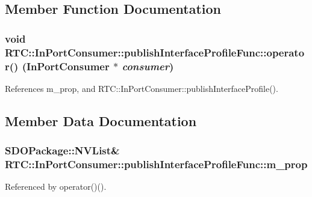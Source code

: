 \subsection{Member Function Documentation}
\subsubsection[{operator()}]{\setlength{\rightskip}{0pt plus 5cm}void RTC::InPortConsumer::publishInterfaceProfileFunc::operator() ({\bf InPortConsumer} $\ast$ {\em consumer})\hspace{0.3cm}{\ttfamily  [inline]}}\label{structRTC_1_1InPortConsumer_1_1publishInterfaceProfileFunc_a53d2bbae5f325aa19fdeb698fe347907}


References m\_\-prop, and RTC::InPortConsumer::publishInterfaceProfile().



\subsection{Member Data Documentation}
\subsubsection[{m\_\-prop}]{\setlength{\rightskip}{0pt plus 5cm}SDOPackage::NVList\& {\bf RTC::InPortConsumer::publishInterfaceProfileFunc::m\_\-prop}}\label{structRTC_1_1InPortConsumer_1_1publishInterfaceProfileFunc_aa78f59e664e6a875c46c4aefebfa84d2}


Referenced by operator()().

